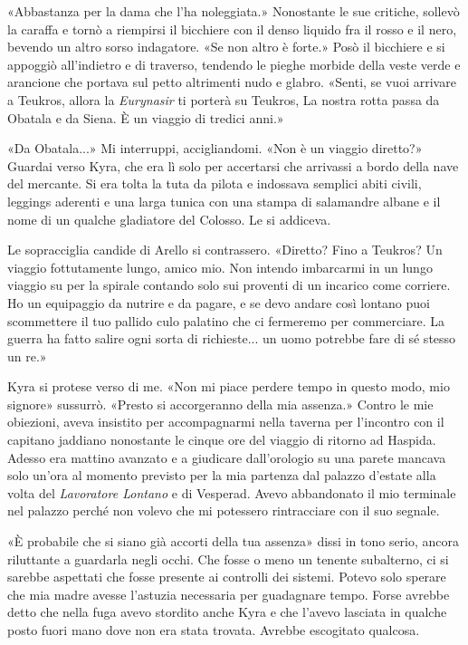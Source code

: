 «Abbastanza per la dama che l'ha noleggiata.» Nonostante le sue
critiche, sollevò la caraffa e tornò a riempirsi il bicchiere con il
denso liquido fra il rosso e il nero, bevendo un altro sorso indagatore.
«Se non altro è forte.» Posò il bicchiere e si appoggiò all'indietro e
di traverso, tendendo le pieghe morbide della veste verde e arancione
che portava sul petto altrimenti nudo e glabro. «Senti, se vuoi arrivare
a Teukros, allora la \emph{Eurynasir} ti porterà su Teukros, La nostra
rotta passa da Obatala e da Siena. È un viaggio di tredici anni.»

«Da Obatala...» Mi interruppi, accigliandomi. «Non è un viaggio
diretto?» Guardai verso Kyra, che era lì solo per accertarsi che
arrivassi a bordo della nave del mercante. Si era tolta la tuta da
pilota e indossava semplici abiti civili, leggings aderenti e una larga
tunica con una stampa di salamandre albane e il nome di un qualche
gladiatore del Colosso. Le si addiceva.

Le sopracciglia candide di Arello si contrassero. «Diretto? Fino a
Teukros? Un viaggio fottutamente lungo, amico mio. Non intendo
imbarcarmi in un lungo viaggio su per la spirale contando solo sui
proventi di un incarico come corriere. Ho un equipaggio da nutrire e da
pagare, e se devo andare così lontano puoi scommettere il tuo pallido
culo palatino che ci fermeremo per commerciare. La guerra ha fatto
salire ogni sorta di richieste... un uomo potrebbe fare di sé stesso un
re.»

Kyra si protese verso di me. «Non mi piace perdere tempo in questo modo,
mio signore» sussurrò. «Presto si accorgeranno della mia assenza.»
Contro le mie obiezioni, aveva insistito per accompagnarmi nella taverna
per l'incontro con il capitano jaddiano {nonostante} le cinque ore del
viaggio di ritorno ad Haspida. Adesso era mattino avanzato e a giudicare
dall'orologio su una parete mancava solo un'ora al momento previsto per
la mia partenza dal palazzo d'estate alla volta del \emph{Lavoratore
	Lontano} e di Vesperad. Avevo abbandonato il mio terminale nel palazzo
perché non volevo che mi potessero rintracciare con il suo segnale.

«È probabile che si siano già accorti della tua assenza» dissi in tono
serio, ancora riluttante a guardarla negli occhi. Che fosse o meno un
tenente subalterno, ci si sarebbe aspettati che fosse presente ai
controlli dei sistemi. Potevo solo sperare che mia madre avesse
l'astuzia necessaria per guadagnare tempo. Forse avrebbe detto che nella
fuga avevo stordito anche Kyra e che l'avevo lasciata in qualche posto
fuori mano dove non era stata trovata. Avrebbe escogitato qualcosa.


